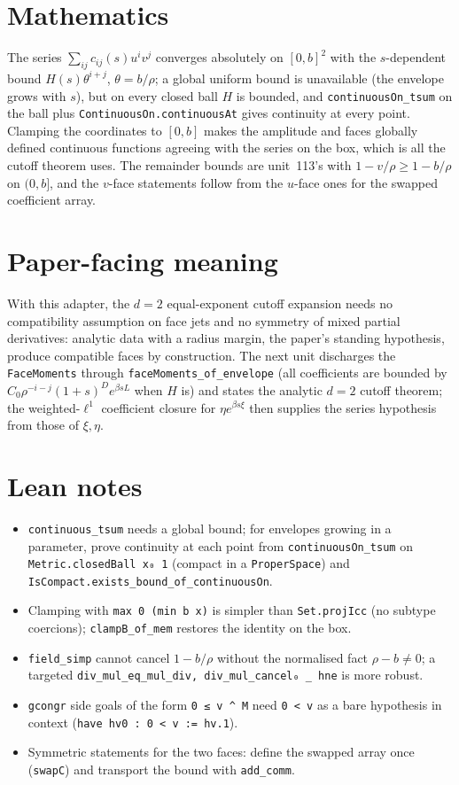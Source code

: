 \documentclass[11pt]{article}
\begin{document}
\section{Mathematics}

The series $\sum_{ij}c_{ij}(s)u^iv^j$ converges absolutely on $[0,b]^2$ with the $s$-dependent bound
$H(s)\theta^{i+j}$, $\theta=b/\rho$; a global uniform bound is unavailable (the envelope grows with
$s$), but on every closed ball $H$ is bounded, and \texttt{continuousOn\_tsum} on the ball plus
\texttt{ContinuousOn.continuousAt} gives continuity at every point. Clamping the coordinates to
$[0,b]$ makes the amplitude and faces globally defined continuous functions agreeing with the series on
the box, which is all the cutoff theorem uses. The remainder bounds are unit~113's with
$1-v/\rho\ge1-b/\rho$ on $(0,b]$, and the $v$-face statements follow from the $u$-face ones for the
swapped coefficient array.

\section{Paper-facing meaning}

With this adapter, the $d=2$ equal-exponent cutoff expansion needs no compatibility assumption on
face jets and no symmetry of mixed partial derivatives: analytic data with a radius margin, the
paper's standing hypothesis, produce compatible faces by construction. The next unit discharges the
\texttt{FaceMoments} through \texttt{faceMoments\_of\_envelope} (all coefficients are bounded by
$C_0\rho^{-i-j}(1+s)^De^{\beta sL}$ when $H$ is) and states the analytic $d=2$ cutoff theorem; the
weighted-$\ell^1$ coefficient closure for $\eta e^{\beta s\xi}$ then supplies the series hypothesis
from those of $\xi,\eta$.

\section{Lean notes}

\begin{itemize}
\item \texttt{continuous\_tsum} needs a global bound; for envelopes growing in a parameter, prove
continuity at each point from \texttt{continuousOn\_tsum} on \texttt{Metric.closedBall x₀ 1}
(compact in a \texttt{ProperSpace}) and \texttt{IsCompact.exists\_bound\_of\_continuousOn}.
\item Clamping with \texttt{max 0 (min b x)} is simpler than \texttt{Set.projIcc} (no subtype
coercions); \texttt{clampB\_of\_mem} restores the identity on the box.
\item \texttt{field\_simp} cannot cancel $1-b/\rho$ without the normalised fact $\rho-b\ne0$; a
targeted \texttt{div\_mul\_eq\_mul\_div, div\_mul\_cancel₀ \_ hne} is more robust.
\item \texttt{gcongr} side goals of the form \texttt{0 ≤ v \^{} M} need \texttt{0 < v} as a bare
hypothesis in context (\texttt{have hv0 : 0 < v := hv.1}).
\item Symmetric statements for the two faces: define the swapped array once (\texttt{swapC}) and
transport the bound with \texttt{add\_comm}.
\end{itemize}
\end{document}
